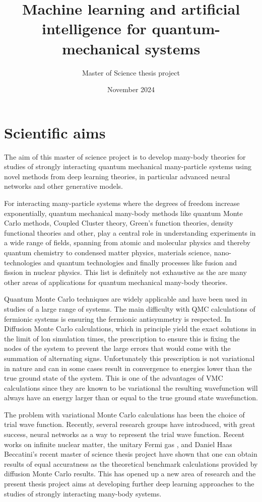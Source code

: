 \documentclass{article}
\title{Machine learning and artificial intelligence for quantum-mechanical systems}
\author{Master of Science thesis project}
\date{November 2024}
\begin{document}
\maketitle  

\section{Scientific aims}


The aim of this master of science project is to develop many-body
theories for studies of strongly interacting quantum mechanical
many-particle systems using novel methods from deep learning theories,
in particular advanced neural networks and other generative models.

For interacting many-particle systems where the degrees of freedom
increase exponentially, quantum mechanical many-body methods like
quantum Monte Carlo methods, Coupled Cluster theory, Green's function
theories, density functional theories and other, play a central role
in understanding experiments in a wide range of fields, spanning from
atomic and molecular physics and thereby quantum chemistry to
condensed matter physics, materials science, nano-technologies and
quantum technologies and finally processes like fusion and fission in
nuclear physics. This list is definitely not exhaustive as the are
many other areas of applications for quantum mechanical many-body
theories.


Quantum Monte Carlo techniques are widely applicable and have been
used in studies of a large range of systems.  The main difficulty with
QMC calculations of fermionic systems is ensuring the fermionic
antisymmetry is respected. In Diffusion Monte Carlo calculations,
which in principle yield the exact solutions in the limit of lon
simulation times, the prescription to ensure this is fixing the nodes
of the system to prevent the large errors that would come with the
summation of alternating signs. Unfortunately this prescription is not
variational in nature and can in some cases result in convergence to
energies lower than the true ground state of the system. This is one
of the advantages of VMC calculations since they are known to be
variational the resulting wavefunction will always have an energy
larger than or equal to the true ground state wavefunction.

The problem with variational Monte Carlo calculations has been the
choice of trial wave function.  Recently, several research groups have
introduced, with great success, neural networks as a way to represent
the trial wave function. Recent works on infinite nuclear
matter\cite{us2023a,us2024}, the unitary Fermi gas \cite{us2023b}, and
Daniel Haas Beccatini's recent master of science thesis project
\cite{daniel2024} have shown that one can obtain results of equal
accuratness as the theoretical benchmark calculations provided by
diffusion Monte Carlo results.  This has opened up a new area of
research and the present thesis project aims at developing further
deep learning approaches to the studies of strongly interacting
many-body systems.
\end{document}
